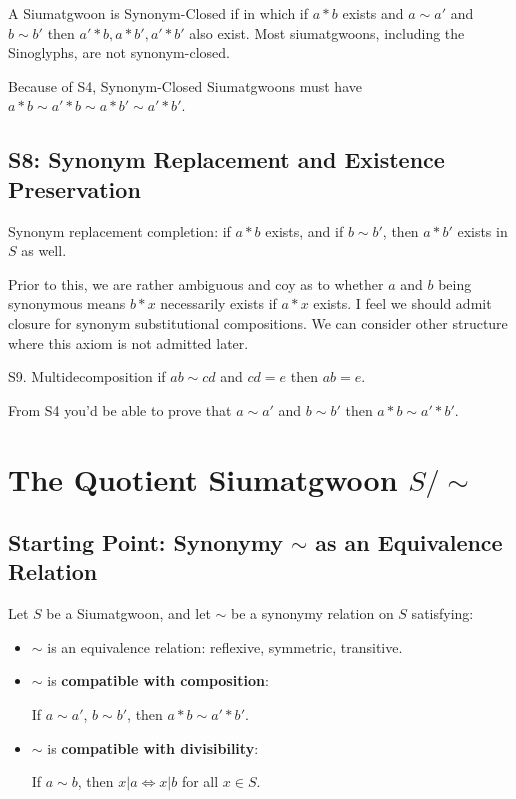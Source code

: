 A Siumatgwoon is Synonym-Closed if in which if $a*b$ exists and $a\sim a'$ and $b\sim b'$ then $a'*b, a*b', a'*b'$ also exist. Most siumatgwoons, including the Sinoglyphs, are not synonym-closed. 

Because of S4, Synonym-Closed Siumatgwoons must have $a*b \sim a'*b \sim a*b'\sim a'*b'$.

\subsection{S8: Synonym Replacement and Existence Preservation}

Synonym replacement completion: if $a*b$ exists, and if $b\sim b'$, then $a*b'$ exists in $S$ as well.

Prior to this, we are rather ambiguous and coy as to whether $a$ and $b$ being synonymous means $b*x$ necessarily exists if $a*x$ exists. I feel we should admit closure for synonym substitutional compositions. We can consider other structure where this axiom is not admitted later.

S9. Multidecomposition if $ab \sim cd$ and $cd = e$ then $ab =e$. 

From S4 you'd be able to prove that $a \sim a'$ and $b\sim b'$ then $a * b \sim a' * b'$.

\section{The Quotient Siumatgwoon $S/\sim$}

\subsection{Starting Point: Synonymy $\sim$ as an Equivalence Relation}

Let $S$ be a Siumatgwoon, and let $\sim$ be a synonymy relation on $S$ satisfying:

\begin{itemize}
\item $\sim$ is an equivalence relation: reflexive, symmetric, transitive.
\item $\sim$ is \textbf{compatible with composition}:
    
    If $a\sim a'$, $b\sim b'$, then $a*b\sim a'*b'$.
    
\item $\sim$ is \textbf{compatible with divisibility}:
    
    If $a\sim b$, then $x|a \iff x|b$ for all $x\in S$.
\end{itemize}

